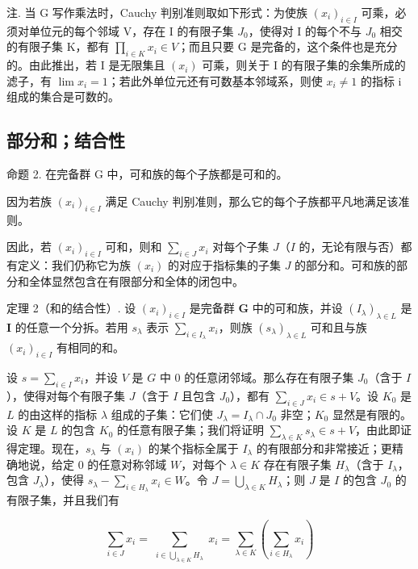 注. 当 G 写作乘法时，Cauchy 判别准则取如下形式：为使族 \((x_{i})_{i\in I}\) 可乘，必须对单位元的每个邻域 V，存在 I 的有限子集 \(J_{0}\)，使得对 I 的每个不与 \(J_{0}\) 相交的有限子集 K，都有 \(\prod_{i\in K}x_{i}\in V\)；而且只要 G 是完备的，这个条件也是充分的。由此推出，若 I 是无限集且 \((x_{i})\) 可乘，则关于 I 的有限子集的余集所成的滤子，有 \(\lim x_{i}=1\)；若此外单位元还有可数基本邻域系，则使 \(x_{i}\neq1\) 的指标 i 组成的集合是可数的。

\subsection{部分和；结合性}

命题 2. 在完备群 G 中，可和族的每个子族都是可和的。

因为若族 \((x_{i})_{i\in I}\) 满足 Cauchy 判别准则，那么它的每个子族都平凡地满足该准则。

因此，若 \((x_{i})_{i\in I}\) 可和，则和 \(\sum_{i\in J}x_{i}\) 对每个子集 \(J\)（\(I\) 的，无论有限与否）都有定义：我们仍称它为族 \((x_{i})\) 的对应于指标集的子集 \(J\) 的部分和。可和族的部分和全体显然包含在有限部分和全体的闭包中。

定理 2（和的结合性）. 设 \((x_{i})_{i\in I}\) 是完备群 \(\mathbf{G}\) 中的可和族，并设 \((I_{\lambda})_{\lambda \in L}\) 是 \(\mathbf{I}\) 的任意一个分拆。若用 \(s_{\lambda}\) 表示 \(\sum_{i\in I_{\lambda}}x_{i}\)，则族 \((s_{\lambda})_{\lambda \in L}\) 可和且与族 \((x_{i})_{i\in I}\) 有相同的和。

设 \(s = \sum_{i \in I} x_i\)，并设 \(V\) 是 \(G\) 中 0 的任意闭邻域。那么存在有限子集 \(J_0\)（含于 \(I\)），使得对每个有限子集 \(J\)（含于 \(I\) 且包含 \(J_0\)），都有 \(\sum_{i \in J} x_i \in s + V\)。设 \(K_0\) 是 \(L\) 的由这样的指标 \(\lambda\) 组成的子集：它们使 \(J_\lambda = I_\lambda \cap J_0\) 非空；\(K_0\) 显然是有限的。设 \(K\) 是 \(L\) 的包含 \(K_0\) 的任意有限子集；我们将证明 \(\sum_{\lambda \in K} s_\lambda \in s + V\)，由此即证得定理。现在，\(s_\lambda\) 与 \((x_i)\) 的某个指标全属于 \(I_\lambda\) 的有限部分和非常接近；更精确地说，给定 0 的任意对称邻域 \(W\)，对每个 \(\lambda \in K\) 存在有限子集 \(H_\lambda\)（含于 \(I_\lambda\)，包含 \(J_\lambda\)），使得 \(s_\lambda - \sum_{i \in H_\lambda} x_i \in W\)。令 \(J = \bigcup_{\lambda \in K} H_\lambda\)；则 \(J\) 是 \(I\) 的包含 \(J_0\) 的有限子集，并且我们有

\[
\sum_ {i \in J} x _ {i} = \sum_ {\substack {i \in \bigcup_ {\lambda \in K} H _ {\lambda}}} x _ {i} = \sum_ {\lambda \in K} (\sum_ {i \in H _ {\lambda}} x _ {i})
\]

